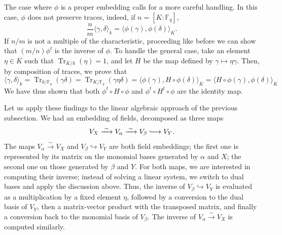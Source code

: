 \documentclass[12pt]{article}
\theoremstyle{plain}
\theoremstyle{definition}
\newcommand{\ang}[1]{\langle#1\rangle}
\DeclareMathOperator{\trace}{Tr} %
\def\F{\ensuremath{\mathbb{F}}}
\begin{document}
The case where $\phi$ is a proper embedding calls for a more careful
handling. %
In this case, $\phi$ does not preserve traces, indeed, if $n=[K:\F_q]$,
\begin{equation*}
  \frac{n}{m}\ang{\gamma,\delta}_k = \ang{\phi(\gamma),\phi(\delta)}_K.
\end{equation*}
If $n/m$ is not a multiple of the characteristic, proceeding like
before we can show that $(m/n)\phi^t$ is the inverse of $\phi$. %
To handle the general case, take an element $\eta\in K$ such that
$\trace_{K/k}(\eta)=1$, and let $H$ be the map defined by
$\gamma\mapsto\eta\gamma$. %
Then, by composition of traces, we prove that
\begin{equation*}
  \ang{\gamma,\delta}_k = \trace_{k/\F_q}(\gamma\delta) =
  \trace_{K/\F_q}(\gamma\eta\delta) = \ang{\phi(\gamma),H\circ\phi(\delta)}_K =
  \ang{H\circ\phi(\gamma),\phi(\delta)}_K 
\end{equation*}
We have thus shown that both $\phi^t\circ H\circ\phi$ and
$\phi^t\circ H^t\circ\phi$ are the identity map.

Let us apply these findings to the linear algebraic approach of the
previous subsection. %
We had an embedding of fields, decomposed as three maps
\[V_X \xrightarrow{\;\sim\;} V_\alpha \xrightarrow{\;\sim\;} V_\beta
  \lhook\joinrel\longrightarrow V_Y.\] %
The maps $V_\alpha\xrightarrow{\sim} V_X$ and
$V_\beta\hookrightarrow V_Y$ are both field embeddings; the first one
is represented by its matrix on the monomial bases generated by
$\alpha$ and $X$; the second one on those generated by $\beta$ and
$Y$. %
For both maps, we are interested in computing their inverse; instead
of solving a linear system, we switch to dual bases and apply the
discussion above. %
Thus, the inverse of $V_\beta\hookrightarrow V_Y$ is evaluated as a
multiplication by a fixed element $\eta$, followed by a conversion to
the dual basis of $V_Y$, then a matrix-vector product with the
transposed matrix, and finally a conversion back to the monomial basis
of $V_\beta$. %
The inverse of $V_\alpha\xrightarrow{\sim}V_X$ is computed similarly. %
\end{document}
